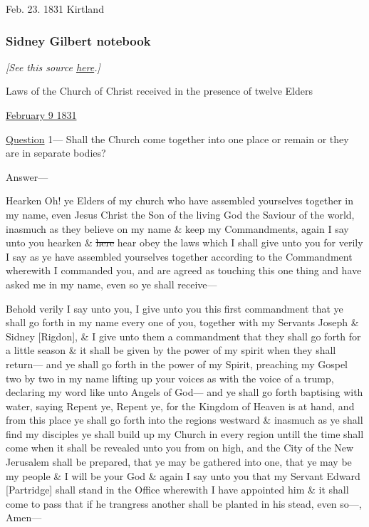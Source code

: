 				Feb. 23. 1831 Kirtland
			
		\subsubsection{Sidney Gilbert notebook}
			\label{EXSS-DC42-EARLY-GILBERT}
			
			\textit{[See this source \href{https://www.josephsmithpapers.org/paper-summary/revelation-9-february-1831-as-recorded-in-gilbert-notebook-dc-421-72/1}{here}.]}
			
			\begin{tightcenter}
				Laws of the Church of Christ received in the presence of twelve Elders

				\uline{February 9}\uline{ 1831}
			\end{tightcenter}

			\uline{Question} 1--- Shall the Church come together into one place or remain or they are in separate bodies?

			Answer---

			Hearken Oh! ye Elders of my church who have assembled yourselves together in my name, even Jesus Christ the Son of the living God the Saviour of the world, inasmuch as they believe on my name \& keep my Commandments, again I say unto you hearken \& \sout{here} hear obey the laws which I shall give unto you for verily I say as ye have assembled yourselves together according to the Commandment wherewith I commanded you, and are agreed as touching this one thing and have asked me in my name, even so ye shall receive---

			Behold verily I say unto you, I give unto you this first commandment that ye shall go forth in my name every one of you, together with my Servants Joseph \& Sidney [Rigdon], \& I give unto them a commandment that they shall go forth for a little season \& it shall be given by the power of my spirit when they shall return--- and ye shall go forth in the power of my Spirit, preaching my Gospel two by two in my name lifting up your voices as with the voice of a trump, declaring my word like unto Angels of God--- and ye shall go forth baptising with water, saying Repent ye, Repent ye, for the Kingdom of Heaven is at hand, and from this place ye shall go forth into the regions westward \& inasmuch as ye shall find my disciples ye shall build up my Church in every region untill the time shall come when it shall be revealed unto you from on high, and the City of the New Jerusalem shall be prepared, that ye may be gathered into one, that ye may be my people \& I will be your God \& again I say unto you that my Servant Edward [Partridge] shall stand in the Office wherewith I have appointed him \& it shall come to pass that if he trangress another shall be planted in his stead, even so---, Amen---

